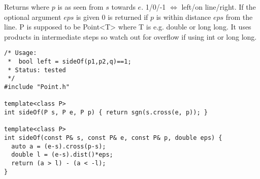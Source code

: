 Returns where $p$ is as seen from $s$ towards $e$. 1/0/-1 $\Leftrightarrow$ left/on line/right. If the optional argument $eps$ is given 0 is returned if $p$ is within distance $eps$ from the line. P is supposed to be Point<T> where T is e.g. double or long long. It uses products in intermediate steps so watch out for overflow if using int or long long.
\begin{verbatim}
/* Usage:
 *  bool left = sideOf(p1,p2,q)==1;
 * Status: tested
 */
#include "Point.h"

template<class P>
int sideOf(P s, P e, P p) { return sgn(s.cross(e, p)); }

template<class P>
int sideOf(const P& s, const P& e, const P& p, double eps) {
  auto a = (e-s).cross(p-s);
  double l = (e-s).dist()*eps;
  return (a > l) - (a < -l);
}
\end{verbatim}